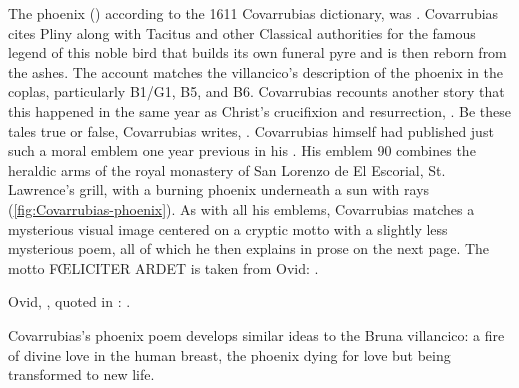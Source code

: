 The phoenix () according to the 1611 Covarrubias dictionary, was .%
    \Autocite[400, ]{Covarrubias:Tesoro}
Covarrubias cites Pliny along with Tacitus and other Classical authorities for the famous legend of this noble bird that builds its own funeral pyre and is then reborn from the ashes.
The account matches the villancico's description of the phoenix in the coplas, particularly B1/G1, B5, and B6.
Covarrubias recounts another story that this happened in the same year as Christ's crucifixion and resurrection, .
Be these tales true or false, Covarrubias writes, .%
    \Autocite[400]{Covarrubias:Tesoro}
Covarrubias himself had published just such a moral emblem one year previous in his .
His emblem 90 combines the heraldic arms of the royal monastery of San Lorenzo de El Escorial, St. Lawrence's grill, with a burning phoenix underneath a sun with rays (\cref{fig:Covarrubias-phoenix}).
    \Autocite[f.~290, r--v]{Covarrubias:Emblemas}
As with all his emblems, Covarrubias matches a mysterious visual image centered on a cryptic motto with a slightly less mysterious poem, all of which he then explains in prose on the next page.
The motto FŒLICITER ARDET is taken from Ovid: .%
\begin{footnote}
    Ovid, , quoted in \autocite[290v]{Covarrubias:Emblemas}: 
    .
\end{footnote}

Covarrubias's phoenix poem develops similar ideas to the Bruna villancico: a fire of divine love in the human breast, the phoenix dying for love but being transformed to new life.

